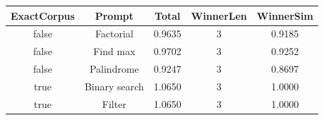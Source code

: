 \begin{table}[h]
\centering
\begin{tabular}{ |c|c|c|c|c| }
\hline
ExactCorpus & Prompt & Total & WinnerLen & WinnerSim \\
\hline
false & Factorial & 0.9635 & 3 & 0.9185 \\
\hline
false & Find max & 0.9702 & 3 & 0.9252 \\
\hline
false & Palindrome & 0.9247 & 3 & 0.8697 \\
\hline
true & Binary search & 1.0650 & 3 & 1.0000 \\
\hline
true & Filter & 1.0650 & 3 & 1.0000 \\
\hline
\end{tabular}
\end{table}
